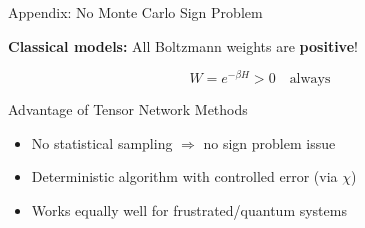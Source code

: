 \documentclass[aspectratio=169, 11pt]{beamer}
\newcommand{\highlight}[1]{\textcolor{accentred}{\textbf{#1}}}
\begin{document}

\begin{frame}{Appendix: No Monte Carlo Sign Problem}
    
    \textbf{Classical models:} All Boltzmann weights are \highlight{positive}!
    
    \[
    W = e^{-\beta H} > 0 \quad \text{always}
    \]
    
    \vspace{0.3cm}
    
    \begin{center}
    \end{center}
    
    \vspace{0.3cm}
    
    \begin{block}{Advantage of Tensor Network Methods}
        \begin{itemize}
            \item No statistical sampling $\Rightarrow$ no sign problem issue
            \item Deterministic algorithm with controlled error (via $\chi$)
            \item Works equally well for frustrated/quantum systems
        \end{itemize}
    \end{block}
\end{frame}
\end{document}
